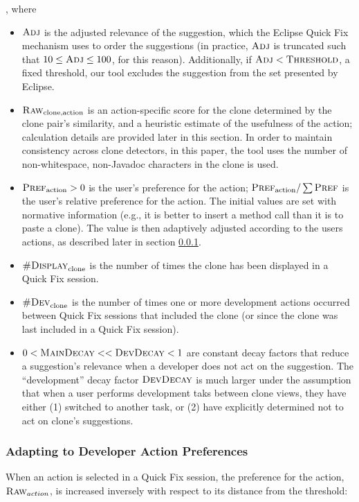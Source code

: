 \documentclass[nocopyrightspace,10pt]{sigplanconf}
\begin{document}
\noindent, where 
\begin{itemize}
  \item $\textsc{Adj}$ is the adjusted relevance of the suggestion, which the
    Eclipse Quick Fix mechanism uses to order the suggestions (in
    practice, $\textsc{Adj}$ is truncated such that $10 \le \textsc{Adj} \le 100$,
    for this reason). Additionally, if $\textsc{Adj} < \textsc{Threshold}$, a fixed threshold, our
    tool excludes the suggestion from the set presented
    by Eclipse.
  \item $\textsc{Raw}_{\text{clone},\text{action}}$ is an action-specific score for the clone
    determined by the clone pair's similarity, and a heuristic
    estimate of the usefulness of the action; calculation details
    are provided later in this section. 
    In order to maintain consistency across clone detectors, in this paper, the tool uses the
    number of non-whitespace, non-Javadoc characters in the clone is
    used.
  \item $\textsc{Pref}_{\text{action}} > 0$ is the user's preference for the action; $\textsc{Pref}_{\text{action}} / 
    \sum{\textsc{Pref}}$ is the user's relative preference for the action. The
    initial values are set with normative information (e.g., it is
    better to insert a method call than it is to paste a clone). The
    value is then adaptively adjusted according to the users actions, as described
    later in section \ref{sec:preference}.
  \item $\textsc{\#Display}_{\text{clone}}$ is the number of times the clone has been
    displayed in a Quick Fix session.
  \item $\textsc{\#Dev}_{\text{clone}}$ is the number of times one or more development
    actions occurred between Quick Fix sessions that included the
    clone (or since the clone was last included in a Quick Fix
    session).
  \item $0 < \textsc{MainDecay} << \textsc{DevDecay} < 1$ are constant
    decay factors that reduce a suggestion's relevance when a
    developer does not act on the suggestion. The ``development'' decay
    factor $\textsc{DevDecay}$ is much larger under the assumption
    that when a user performs development taks between clone views,
    they have either (1) switched to another task, or (2) have
    explicitly determined not to act on clone's suggestions.
\end{itemize} 

\subsubsection{Adapting to Developer Action Preferences}
\label{sec:preference}
When an action is selected in a Quick Fix session, the preference for
the action, $\textsc{Raw}_{action}$, is increased inversely with respect to its
distance from the threshold:
\end{document}
